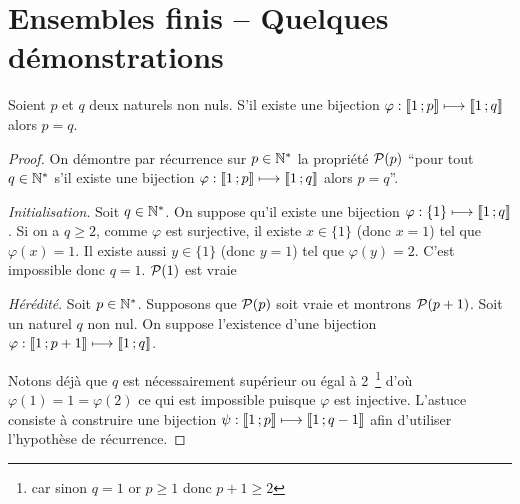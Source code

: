 \chapter{Ensembles finis -- Quelques démonstrations}
\label{chap:ensemblesFinis}
\begin{theo}
  Soient $p$ et $q$ deux naturels non nuls. S'il existe une bijection $\varphi : \intervalleentier{1}{p} \longmapsto \intervalleentier{1}{q}$ alors $p=q$.
\end{theo}
\begin{proof}
  On démontre par récurrence sur $p \in \N^*$ la propriété $\P(p)$ ``pour tout $q \in \N^*$ s'il existe une bijection $\varphi : \intervalleentier{1}{p} \longmapsto \intervalleentier{1}{q}$ alors $p=q$''.

\emph{Initialisation}. Soit $q \in \N^*$. On suppose qu'il existe une bijection $\varphi : \{1\} \longmapsto \intervalleentier{1}{q}$. Si on a $q \geq 2$, comme $\varphi$ est surjective, il existe $x \in \{1\}$ (donc $x=1$) tel que $\varphi(x)=1$. Il existe aussi $y \in \{1\}$ (donc $y=1$) tel que $\varphi(y) = 2$. C'est impossible donc $q=1$. $\P(1)$ est vraie

\emph{Hérédité}. Soit $p \in \N^*$. Supposons que $\P(p)$ soit vraie et montrons $\P(p+1)$. Soit un naturel $q$ non nul. On suppose l'existence d'une bijection $\varphi : \intervalleentier{1}{p+1} \longmapsto \intervalleentier{1}{q}$.

Notons déjà que $q$ est nécessairement supérieur ou égal à 2~\footnote{car sinon $q=1$ or $p \geq 1$ donc $p+1 \geq 2$} d'où $\varphi(1)=1=\varphi(2)$ ce qui est impossible puisque $\varphi$ est injective. L'astuce consiste à construire une bijection $\psi : \intervalleentier{1}{p} \longmapsto \intervalleentier{1}{q-1}$ afin d'utiliser l'hypothèse de récurrence.


\end{proof}
